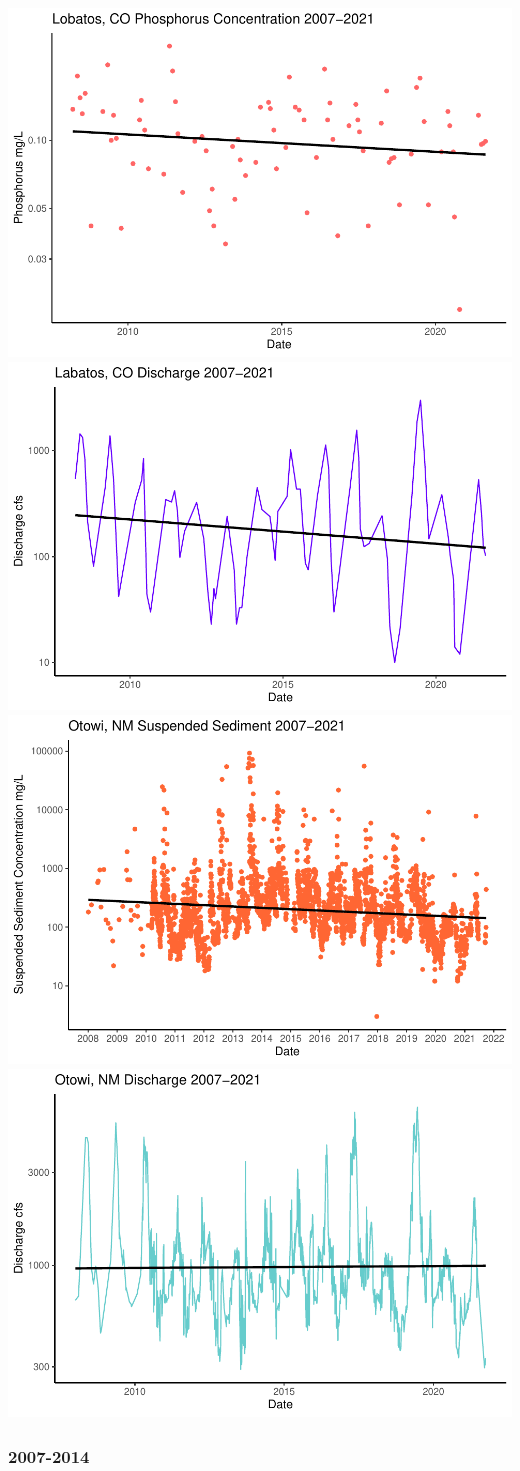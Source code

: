\documentclass[
  12pt,
]{article}
\begin{document}
\includegraphics[width=0.5\linewidth]{Project_Template_files/figure-latex/2007-2021 looking at stream gauge data over time-1}
\includegraphics[width=0.5\linewidth]{Project_Template_files/figure-latex/2007-2021 looking at stream gauge data over time-2}
\includegraphics[width=0.5\linewidth]{Project_Template_files/figure-latex/2007-2021 looking at stream gauge data over time-3}
\includegraphics[width=0.5\linewidth]{Project_Template_files/figure-latex/2007-2021 looking at stream gauge data over time-4}

\hypertarget{section-1}{%
\subsubsection{2007-2014}\label{section-1}}
\end{document}
